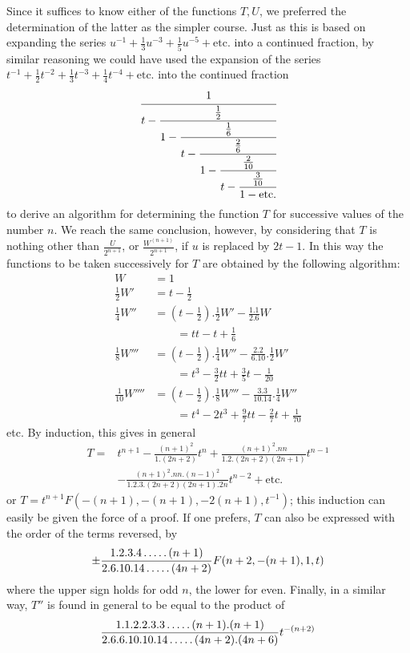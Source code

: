 Since it suffices to know either of the functions $T,U$, we preferred the determination of the latter as the simpler course. Just as this is based on expanding the series $u^{-1}+\frac13u^{-3}+\frac15u^{-5}+\text{etc.}$ into a continued fraction, by similar reasoning we could have used the expansion of the series $t^{-1}+\frac12t^{-2}+\frac13t^{-3}+\frac14t^{-4}+\text{etc.}$ into the continued fraction
\[
\cfrac1{t-\cfrac{\frac12}{1-\cfrac{\frac16}
{t-\cfrac{\frac26}{1-\cfrac{\frac2{10}}
{t-\cfrac{\frac3{10}}{1-\mathrm{etc.}}}}}}}
\]
to derive an algorithm for determining the function $T$ for successive values of the number $n$. We reach the same conclusion, however, by considering that $T$ is nothing other than $\frac U{2^{n+1}}$, or $\frac{W^{(n+1)}}{2^{n+1}}$, if $u$ is replaced by $2t-1$. In this way the functions to be taken successively for $T$ are obtained by the following algorithm:
\[
\begin{aligned}
W&=1\\
\tfrac12W'&=t-\tfrac12\\
\tfrac14W''&=(t-\tfrac12).\tfrac12W'-\frac{1.1}{2.6}W
\\[3pt]&\qquad=tt-t+\tfrac16\\
\tfrac18W'''&=(t-\tfrac12).\tfrac14W''-\frac{2.2}{6.10}.\tfrac12W'
\\[3pt]&\qquad=t^3-\tfrac32tt+\tfrac35t-\tfrac1{20}\\
\tfrac1{10}W''''&=(t-\tfrac12).\tfrac18W'''-\frac{3.3}{10.14}.\tfrac14W''
\\[3pt]&\qquad=t^4-2t^3+\tfrac97tt-\tfrac27t+\tfrac1{70}
\end{aligned}
\]
etc. By induction, this gives in general
\[
\begin{aligned}
T={}&t^{n+1}-\frac{(n+1)^2}{1.(2n+2)}t^n
+\frac{(n+1)^2.nn}{1.2.(2n+2)(2n+1)}t^{n-1}\\
&-\frac{(n+1)^2.nn.(n-1)^2}{1.2.3.(2n+2)(2n+1).2n}t^{n-2}
+\mathrm{etc.}
\end{aligned}
\]
or $T=t^{n+1}F(-(n+1),-(n+1),-2(n+1),t^{-1})$; this induction can easily be given the force of a proof. If one prefers, $T$ can also be expressed with the order of the terms reversed, by
\[
\pm\frac{1.2.3.4\mathinner{.\,.\,.\,.\,.}(n+1)}
{2.6.10.14\mathinner{.\,.\,.\,.\,.}(4n+2)}
F(n+2,-(n+1),1,t)
\]
where the upper sign holds for odd $n$, the lower for even. Finally, in a similar way, $T''$ is found in general to be equal to the product of
\[
\frac{1.1.2.2.3.3\mathinner{.\,.\,.\,.\,.}(n+1).(n+1)}
{2.6.6.10.10.14\mathinner{.\,.\,.\,.\,.}(4n+2).(4n+6)}t^{-(n+2)}
\]
